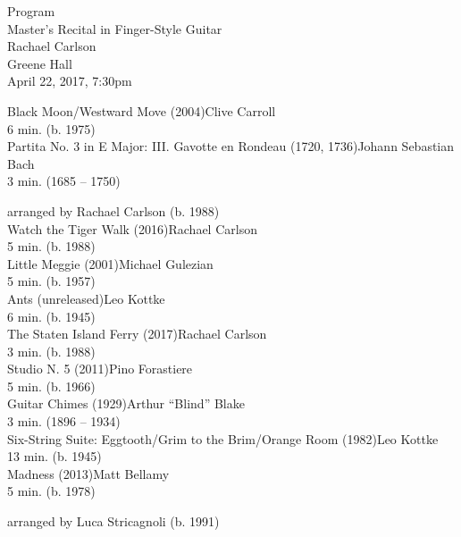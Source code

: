 \message{ !name(carlsonProgramNotes.tex)}\documentclass{article}
\begin{document}

\begin{center}
  Program\\
  Master's Recital in Finger-Style Guitar\\
  Rachael Carlson\\
  Greene Hall\\
  April 22, 2017, 7:30pm
\end{center}
\noindent Black Moon/Westward Move (2004)\dotfill Clive Carroll\\
6 min. \hfill (b. 1975)\\

\noindent Partita No. 3 in E Major: III. Gavotte en Rondeau (1720, 1736)\dotfill Johann Sebastian Bach\\
3 min. \hfill (1685 -- 1750)\\
\strut\hfill arranged by Rachael Carlson (b. 1988)\\

\noindent Watch the Tiger Walk (2016)\dotfill Rachael Carlson\\
5 min. \hfill (b. 1988)\\

\noindent Little Meggie (2001)\dotfill Michael Gulezian\\
5 min. \hfill (b. 1957)\\

\noindent Ants (unreleased)\dotfill Leo Kottke\\
6 min. \hfill (b. 1945)\\

\noindent The Staten Island Ferry (2017)\dotfill Rachael Carlson\\
3 min. \hfill (b. 1988)\\

\noindent Studio N. 5 (2011)\dotfill Pino Forastiere\\
5 min. \hfill (b. 1966)\\

\noindent Guitar Chimes (1929)\dotfill Arthur ``Blind'' Blake\\
3 min. \hfill (1896 -- 1934)\\

\noindent Six-String Suite: Eggtooth/Grim to the Brim/Orange Room (1982)\dotfill Leo Kottke\\
13 min. \hfill (b. 1945)\\

\noindent Madness (2013)\dotfill Matt Bellamy\\
5 min. \hfill (b. 1978)\\
\strut\hfill arranged by Luca Stricagnoli (b. 1991)\\
\end{document}

